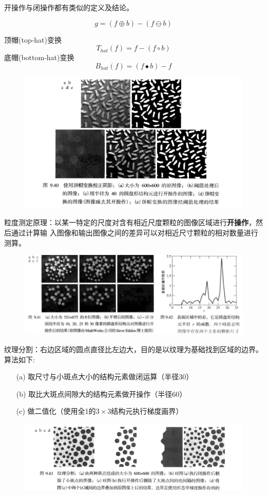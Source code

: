 开操作与闭操作都有类似的定义及结论。

\begin{definition}[形态学梯度]
\[g=(f\oplus b)-(f\ominus b)\]
\end{definition}

\begin{definition}[顶帽与底帽变换]
顶帽(top-hat)变换
\[T_{hat}(f)=f-(f\circ b)\]
底帽(bottom-hat)变换
\[B_{hat}(f)=(f\bullet b)-f\]
\end{definition}

\begin{figure}[H]
\centering
\includegraphics[width=0.8\linewidth]{fig/top-hat.png}
\end{figure}

粒度测定原理：以某一特定的尺度对含有相近尺度颗粒的图像区域进行\textbf{开操作}，然后通过计算输
入图像和输出图像之间的差异可以对相近尺寸颗粒的相对数量进行测算。
\begin{figure}[H]
\centering
\includegraphics[width=\linewidth]{fig/granulometry.png}
\end{figure}

纹理分割：右边区域的圆点直径比左边大，目的是以纹理为基础找到区域的边界。
算法如下:
\begin{itemize}
\item [(a)] 取尺寸与小斑点大小的结构元素做闭运算（半径30）
\item [(b)] 取比大斑点间隙大的结构元素做开操作（半径60）
\item [(c)] 做二值化（使用全1的$3\times 3$结构元执行梯度画界）
\end{itemize}
\begin{figure}[H]
\centering
\includegraphics[width=\linewidth]{fig/texture_segment.png}
\end{figure}